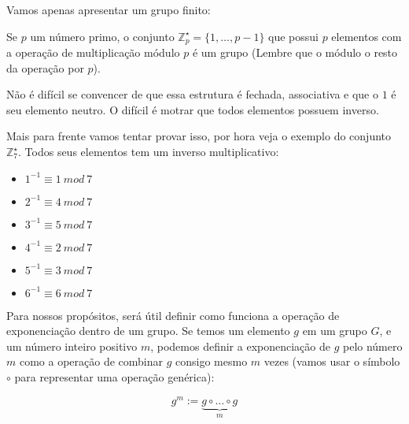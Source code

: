 Vamos apenas apresentar um grupo finito:
\begin{example}
  Se $p$ um número primo, o conjunto $\mathbb{Z}_p^\star = \{ 1, \dots, p-1\}$ que possui $p$ elementos com a operação de multiplicação módulo $p$ é um grupo (Lembre que o módulo o resto da operação por $p$).

    Não é difícil se convencer de que essa estrutura é fechada, associativa e que o $1$ é seu elemento neutro.
    O difícil é motrar que todos elementos possuem inverso.

    Mais para frente vamos tentar provar isso, por hora veja o exemplo do conjunto $\mathbb{Z}_7^\star$.
    Todos seus elementos tem um inverso multiplicativo:
    
    \begin{multicols}{2}
    \begin{itemize}
      \item[] $1^{-1} \equiv 1\ mod\ 7$
      \item[] $2^{-1} \equiv 4\ mod\ 7$
      \item[] $3^{-1} \equiv 5\ mod\ 7$
    \end{itemize}
    \begin{itemize}
      \item[] $4^{-1} \equiv 2\ mod\ 7$
      \item[] $5^{-1} \equiv 3\ mod\ 7$
      \item[] $6^{-1} \equiv 6\ mod\ 7$
    \end{itemize}
  \end{multicols}
\end{example}

Para nossos propósitos, será útil definir como funciona a operação de exponenciação dentro de um grupo.
Se temos um elemento $g$ em um grupo $G$, e um número inteiro positivo $m$, podemos definir a exponenciação de $g$ pelo número $m$ como a operação de combinar $g$ consigo mesmo $m$ vezes (vamos usar o símbolo $\circ$ para representar uma operação genérica):

\begin{displaymath}
  g^m := \underbrace{g \circ \dots \circ g}_m
\end{displaymath}


